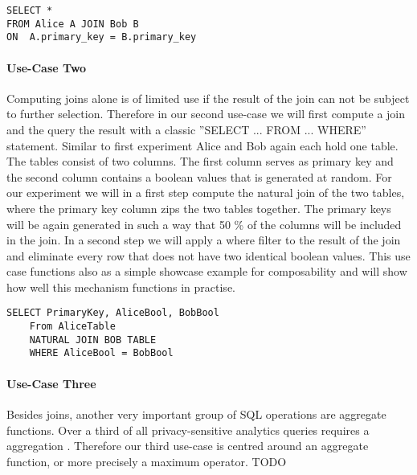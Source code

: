 \label{SQL1_label}				
\begin{lstlisting}[caption={ Functional equivalent SQL statement for our first use-case  }]
SELECT * 
FROM Alice A JOIN Bob B 
ON  A.primary_key = B.primary_key
\end{lstlisting}
\label{SQL1}
	\label{use-case two}		
\paragraph{Use-Case Two}
Computing joins alone is of limited use if the result of the join can not be subject to further selection. Therefore in our second use-case we will first compute a join and the query the result with a classic ''SELECT ... FROM ... WHERE'' statement. Similar to first experiment Alice and Bob again each hold one table. The tables consist of two columns. The first column serves as primary key and the second column contains a boolean values that is generated at random. For our experiment we will in a first step compute the natural join of the two tables, where the primary key column zips the two tables together. The primary keys will be again generated in such a way that 50 \% of the columns will be included in the join. In a second step we will apply a where filter to the result of the join and eliminate every row that does not have two identical boolean values. This use case functions also as a simple showcase example for composability and will show how well this mechanism functions in practise.    
\begin{lstlisting}[caption={Functional equivalent SQL statement for our second use-case}]
	SELECT PrimaryKey, AliceBool, BobBool
	From AliceTable 
	NATURAL JOIN BOB TABLE
	WHERE AliceBool = BobBool
\end{lstlisting}
\paragraph{Use-Case Three}
Besides joins, another very important group of SQL operations are aggregate functions. Over a third of all privacy-sensitive analytics queries requires a aggregation \cite{johnson2017practical}. Therefore our third use-case is centred around an aggregate function, or more precisely a maximum operator.  TODO
 


